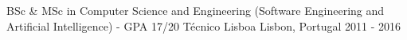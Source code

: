 
\begin{cventries}
  \cventryShort
    {BSc \& MSc in Computer Science and Engineering (Software Engineering and Artificial Intelligence) - GPA 17/20}
    {Técnico Lisboa}
    {Lisbon, Portugal}
    {2011 - 2016}
\end{cventries}
